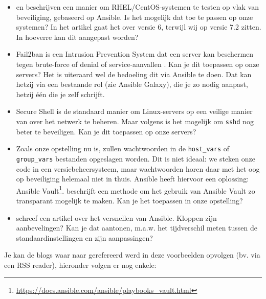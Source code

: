 \begin{itemize}
  \item \textcite{Hayden2015} en \textcite{Davila2015} beschrijven een manier om RHEL/CentOS-systemen te testen op vlak van beveiliging, gebaseerd op Ansible. Is het mogelijk dat toe te passen op onze systemen? In het artikel gaat het over versie 6, terwijl wij op versie 7.2 zitten. In hoeverre kan dit aangepast worden?
  \item Fail2ban is een Intrusion Prevention System dat een server kan beschermen tegen brute-force of denial of service-aanvallen \autocite{Sawiyati2014}. Kan je dit toepassen op onze servers? Het is uiteraard wel de bedoeling dit via Ansible te doen. Dat kan hetzij via een bestaande rol (zie Ansible Galaxy), die je zo nodig aanpast, hetzij één die je zelf schrijft.
  \item Secure Shell is de standaard manier om Linux-servers op een veilige manier van over het netwerk te beheren. Maar volgens \textcite{stribika2015} is het mogelijk om \texttt{sshd} nog beter te beveiligen. Kan je dit toepassen op onze servers?
  \item Zoals onze opstelling nu is, zullen wachtwoorden in de \texttt{host\_vars} of \texttt{group\_vars} bestanden opgeslagen worden. Dit is niet ideaal: we steken onze code in een versiebeheersysteem, maar wachtwoorden horen daar met het oog op beveiliging helemaal niet in thuis. Ansible heeft hiervoor een oplossing: Ansible Vault\footnote{\url{https://docs.ansible.com/ansible/playbooks_vault.html}}. \textcite{Blanc2015} beschrijft een methode om het gebruik van Ansible Vault zo transparant mogelijk te maken. Kan je het toepassen in onze opstelling?
  \item \textcite{Johnson2015} schreef een artikel over het versnellen van Ansible. Kloppen zijn aanbevelingen? Kan je dat aantonen, m.a.w. het tijdverschil meten tussen de standaardinstellingen en zijn aanpassingen?
\end{itemize}

Je kan de blogs waar naar gerefereerd werd in deze voorbeelden opvolgen (bv. via een RSS reader), hieronder volgen er nog enkele:

